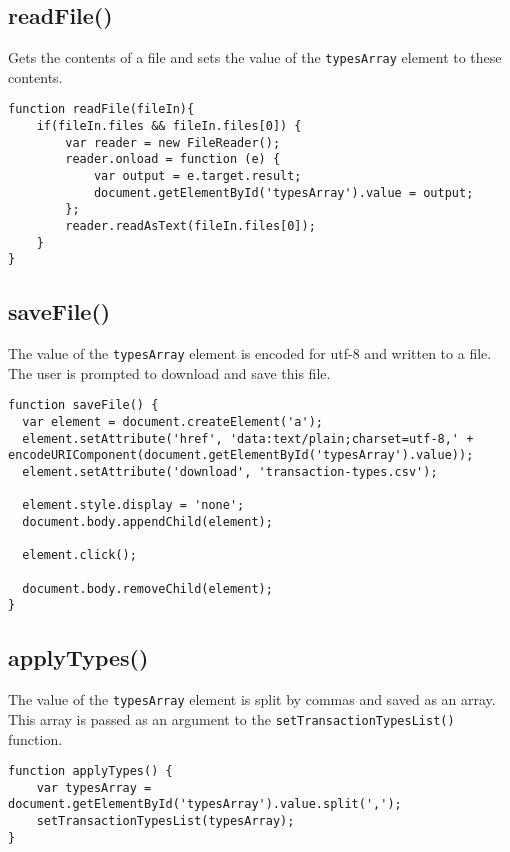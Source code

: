 \documentclass[letterpaper]{article}
\begin{document}
\subsection{readFile()}

Gets the contents of a file and sets the value of the \lstinline{typesArray} element to these contents.

\begin{lstlisting}[firstnumber=644]
function readFile(fileIn){
    if(fileIn.files && fileIn.files[0]) {
        var reader = new FileReader();
        reader.onload = function (e) {
            var output = e.target.result;
            document.getElementById('typesArray').value = output;
        };
        reader.readAsText(fileIn.files[0]);
    }
}
\end{lstlisting}

\subsection{saveFile()}

The value of the \lstinline{typesArray} element is encoded for utf-8 and written to a file.
The user is prompted to download and save this file.

\begin{lstlisting}[firstnumber=655]
function saveFile() {
  var element = document.createElement('a');
  element.setAttribute('href', 'data:text/plain;charset=utf-8,' + encodeURIComponent(document.getElementById('typesArray').value));
  element.setAttribute('download', 'transaction-types.csv');

  element.style.display = 'none';
  document.body.appendChild(element);

  element.click();

  document.body.removeChild(element);
}
\end{lstlisting}

\subsection{applyTypes()}

The value of the \lstinline{typesArray} element is split by commas and saved as an array.
This array is passed as an argument to the \lstinline{setTransactionTypesList()} function.

\begin{lstlisting}[firstnumber=668]
function applyTypes() {
    var typesArray = document.getElementById('typesArray').value.split(',');
    setTransactionTypesList(typesArray);
}
\end{lstlisting}
\end{document}
